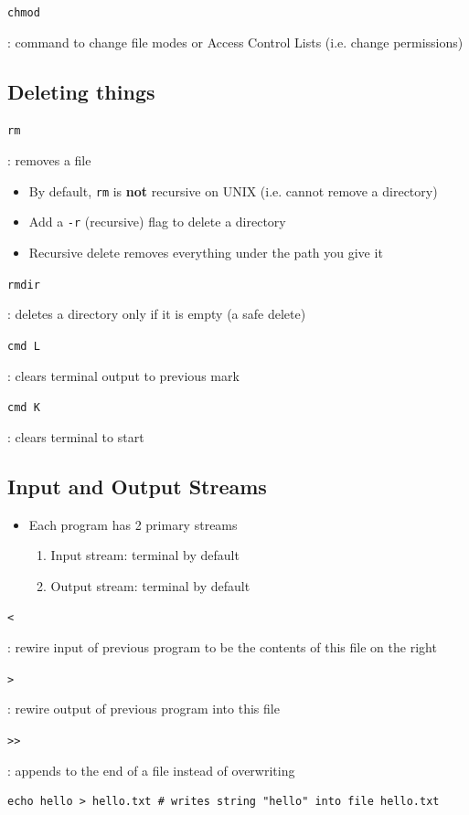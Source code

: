 \documentclass[letterpaper,12pt]{article}
\newcommand*{\lstitem}[1]{
  \setbox0\hbox{\lstinline{#1}}
  \item[\usebox0]
}
\begin{document}
\begin{description}
 \lstitem{chmod}: command to change file modes or Access Control Lists (i.e. change permissions)
\end{description}

\subsection{Deleting things}
\begin{description}
 \lstitem{rm}: removes a file
\end{description}

\begin{itemize}
 \item By default, \lstinline{rm} is \textbf{not} recursive on UNIX (i.e. cannot remove a directory)
 \item Add a \lstinline{-r} (recursive) flag to delete a directory
 \item Recursive delete removes everything under the path you give it
\end{itemize}

\begin{description}
 \lstitem{rmdir}: deletes a directory only if it is empty (a safe delete)
 \lstitem{cmd L}: clears terminal output to previous mark
 \lstitem{cmd K}: clears terminal to start
\end{description}

\subsection{Input and Output Streams}
\begin{itemize}
 \item Each program has 2 primary streams
       \begin{enumerate}
        \item Input stream: terminal by default
        \item Output stream: terminal by default
       \end{enumerate}
\end{itemize}

\begin{description}
 \lstitem{<}: rewire input of previous program to be the contents of this file on the right
 \lstitem{>}: rewire output of previous program into this file
 \lstitem{>>}: appends to the end of a file instead of overwriting
\end{description}

\begin{lstlisting}
echo hello > hello.txt # writes string "hello" into file hello.txt
\end{lstlisting}
\end{document}
